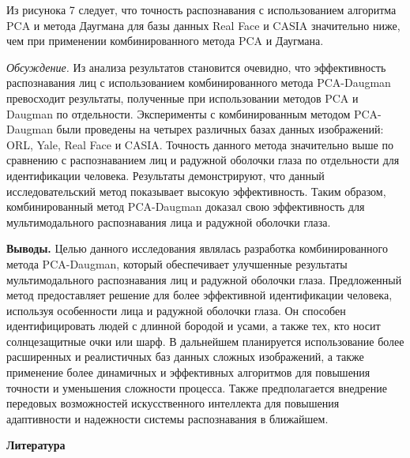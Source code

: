 \begin{multicols}{2}
Из рисунока 7 следует, что точность распознавания с использованием
алгоритма PCA и метода Даугмана для базы данных Real Face и CASIA
значительно ниже, чем при применении комбинированного метода PCA и
Даугмана.

\emph{Обсуждение.} Из анализа результатов становится очевидно, что
эффективность распознавания лиц с использованием комбинированного метода
PCA-Daugman превосходит результаты, полученные при использовании методов
PCA и Daugman по отдельности. Эксперименты с комбинированным методом
PCA-Daugman были проведены на четырех различных базах данных
изображений: ORL, Yale, Real Face и CASIA. Точность данного метода
значительно выше по сравнению с распознаванием лиц и радужной оболочки
глаза по отдельности для идентификации человека. Результаты
демонстрируют, что данный исследовательский метод показывает высокую
эффективность. Таким образом, комбинированный метод PCA-Daugman доказал
свою эффективность для мультимодального распознавания лица и радужной
оболочки глаза.

{\bfseries Выводы.} Целью данного исследования являлась разработка
комбинированного метода PCA-Daugman, который обеспечивает улучшенные
результаты мультимодального распознавания лиц и радужной оболочки глаза.
Предложенный метод предоставляет решение для более эффективной
идентификации человека, используя особенности лица и радужной оболочки
глаза. Он способен идентифицировать людей с длинной бородой и усами, а
также тех, кто носит солнцезащитные очки или шарф. В дальнейшем
планируется использование более расширенных и реалистичных баз данных
сложных изображений, а также применение более динамичных и эффективных
алгоритмов для повышения точности и уменьшения сложности процесса. Также
предполагается внедрение передовых возможностей искусственного
интеллекта для повышения адаптивности и надежности системы распознавания
в ближайшем.
\end{multicols}

\begin{center}
{\bfseries Литература}
\end{center}

